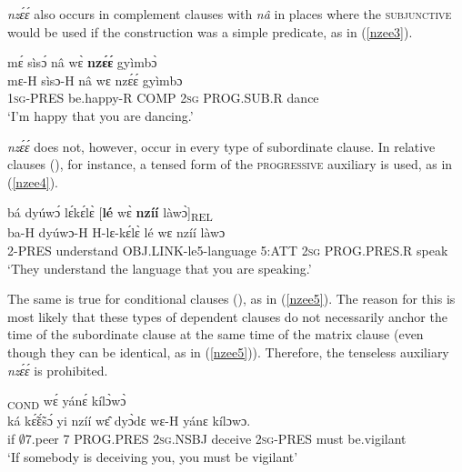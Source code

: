 {\itshape nzɛ́ɛ́} also occurs in complement clauses with {\itshape nâ} in places where the \textsc{subjunctive} would be used if the construction was a simple predicate, as in (\ref{nzee3}).

\begin{exe} 
\ex\label{nzee3}
  \glll  mɛ́ sìsɔ́ nâ wɛ̀ {\bfseries nzɛ́ɛ́} gyìmbɔ̀ \\
         mɛ-H sìsɔ-H nâ wɛ nzɛ́ɛ́ gyìmbɔ \\
         1\textsc{sg}-PRES be.happy-R COMP 2\textsc{sg} PROG.SUB.R dance   \\
    \trans `I'm happy that you are dancing.'
\end{exe}

{\itshape nzɛ́ɛ́} does not, however, occur in every type of subordinate clause. In relative clauses (), for instance, a tensed form of the \textsc{progressive} auxiliary is used, as in (\ref{nzee4}).

\begin{exe} 
\ex\label{nzee4} 
  \glll bá dyúwɔ́ lɛ́kɛ́lɛ̀ [{\bfseries lé} wɛ̀ {\bfseries nzíí} làwɔ̀]\textsubscript{REL} \\
        ba-H dyúwɔ-H H-lɛ-kɛ́lɛ̀ lé wɛ nzíí làwɔ \\
        2-PRES understand OBJ.LINK-le5-language 5:ATT 2\textsc{sg} PROG.PRES.R speak \\
    \trans `They understand the language that you are speaking.'
\end{exe}


\noindent The same is true for conditional clauses (), as in (\ref{nzee5}). The reason for this is most likely that these types of dependent clauses do not necessarily anchor the time of the subordinate clause at the same time of the matrix clause (even though they can be identical, as in (\ref{nzee5})). Therefore, the tenseless auxiliary {\itshape nzɛ́ɛ́} is prohibited.

\begin{exe} 
\ex\label{nzee5}
  \textsubscript{COND} wɛ́ yánɛ́ kílɔ̀wɔ̀ \\
        ká kɛ̃́ɛ̃́sɔ́ yi nzíí wɛ̂ dyɔ̀dɛ wɛ-H yánɛ kílɔwɔ. \\
         if $\emptyset$7.peer 7 PROG.PRES 2\textsc{sg}.NSBJ deceive 2\textsc{sg}-PRES must be.vigilant  \\
    \trans `If somebody is deceiving you, you must be vigilant'
\end{exe}


